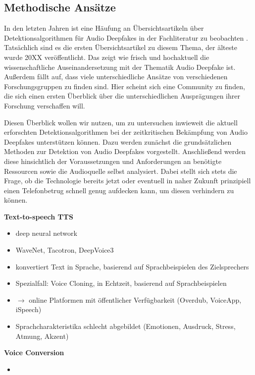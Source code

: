 \subsection{Methodische Ansätze}
In den letzten Jahren ist eine Häufung an Übersichtsartikeln über Detektionsalgorithmen für Audio Deepfakes in der Fachliteratur zu beobachten \citep[][]{Masood2022,Almutairi2022,Khanjani2021}.
Tatsächlich sind es die ersten Übersichtsartikel zu diesem Thema, der älteste wurde 20XX veröffentlicht. %
Das zeigt wie frisch und hochaktuell die wissenschaftliche Auseinandersetzung mit der Thematik Audio Deepfake ist.
Außerdem fällt auf, dass viele unterschiedliche Ansätze von verschiedenen Forschungsgruppen zu finden sind.
Hier scheint sich eine Community zu finden, die sich einen ersten Überblick über die unterschiedlichen Ausprägungen ihrer Forschung verschaffen will.

Diesen Überblick wollen wir nutzen, um zu untersuchen inwieweit die aktuell erforschten Detektionsalgorithmen bei der zeitkritischen Bekämpfung von Audio Deepfakes unterstützen können.
Dazu werden zunächst die grundsätzlichen Methoden zur Detektion von Audio Deepfakes vorgestellt.
Anschließend werden diese hinsichtlich der Voraussetzungen und Anforderungen an benötigte Ressourcen sowie die Audioquelle selbst analysiert.
Dabei stellt sich stets die Frage, ob die Technologie bereits jetzt oder eventuell in naher Zukunft prinzipiell einen Telefonbetrug schnell genug aufdecken kann, um diesen verhindern zu können.

\textbf{Text-to-speech TTS} \citep[][]{Masood2022}
\begin{itemize}
  \item deep neural network
  \item WaveNet, Tacotron, DeepVoice3
  \item konvertiert Text in Sprache, basierend auf Sprachbeispielen des Zielsprechers
  \item Spezialfall: Voice Cloning, in Echtzeit, basierend auf Sprachbeispielen
  \item $\rightarrow$ online Platformen mit öffentlicher Verfügbarkeit (Overdub, VoiceApp, iSpeech)
  \item Sprachcharakteristika schlecht abgebildet (Emotionen, Ausdruck, Stress, Atmung, Akzent)
\end{itemize}

\textbf{Voice Conversion}
\begin{itemize}
  \item 
\end{itemize}
